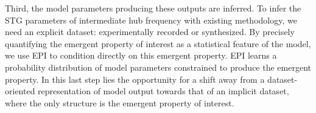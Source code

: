 \documentclass[11pt]{article}
\begin{document}
Third, the model parameters producing these outputs are inferred.
To infer the STG parameters of intermediate hub frequency with existing methodology, we  need an explicit dataset: experimentally recorded or synthesized.
By precisely quantifying the emergent property of interest as a statistical feature of the model, we use EPI to condition directly on this emergent property.
EPI learns a probability distribution of model parameters constrained to produce the emergent property.
In this last step lies the opportunity for a shift away from a dataset-oriented representation of model output towards that of an implicit dataset, where the only structure is the emergent property of interest.
\end{document}
